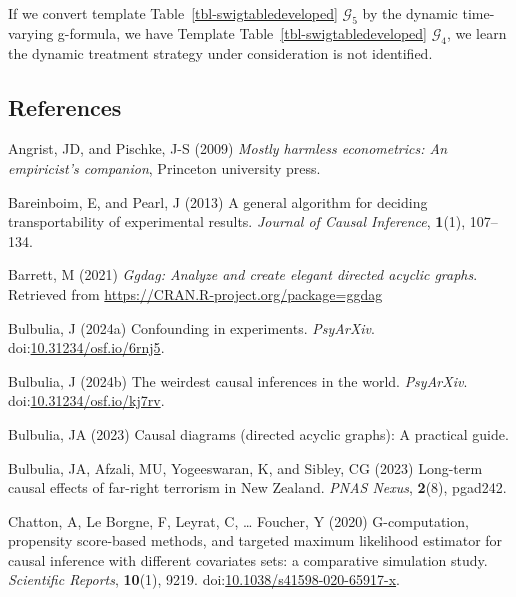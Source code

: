 \documentclass[
  single column]{article}
\newlength{\cslhangindent}
\newenvironment{CSLReferences}[2] %
 {\begin{list}{}{%
  \setlength{\itemindent}{0pt}
  \setlength{\leftmargin}{0pt}
  \setlength{\parsep}{0pt}
  \ifodd #1
   \setlength{\leftmargin}{\cslhangindent}
   \setlength{\itemindent}{-1\cslhangindent}
  \fi
  \setlength{\itemsep}{#2\baselineskip}}}
 {\end{list}}
\begin{document}
If we convert template Table~\ref{tbl-swigtabledeveloped}
\(\mathcal{G}_5\) by the dynamic time-varying g-formula, we have
Template Table~\ref{tbl-swigtabledeveloped} \(\mathcal{G}_4\), we learn
the dynamic treatment strategy under consideration is not identified.

\newpage{}

\subsection{References}\label{references}

\label{refs}
\begin{CSLReferences}{1}{0}
Angrist, JD, and Pischke, J-S (2009) \emph{Mostly harmless econometrics:
An empiricist's companion}, Princeton university press.

Bareinboim, E, and Pearl, J (2013) A general algorithm for deciding
transportability of experimental results. \emph{Journal of Causal
Inference}, \textbf{1}(1), 107--134.

Barrett, M (2021) \emph{Ggdag: Analyze and create elegant directed
acyclic graphs}. Retrieved from
\url{https://CRAN.R-project.org/package=ggdag}

Bulbulia, J (2024a) Confounding in experiments. \emph{PsyArXiv}.
doi:\href{https://doi.org/10.31234/osf.io/6rnj5}{10.31234/osf.io/6rnj5}.

Bulbulia, J (2024b) The weirdest causal inferences in the world.
\emph{PsyArXiv}.
doi:\href{https://doi.org/10.31234/osf.io/kj7rv}{10.31234/osf.io/kj7rv}.

Bulbulia, JA (2023) Causal diagrams (directed acyclic graphs): A
practical guide.

Bulbulia, JA, Afzali, MU, Yogeeswaran, K, and Sibley, CG (2023)
Long-term causal effects of far-right terrorism in {N}ew {Z}ealand.
\emph{PNAS Nexus}, \textbf{2}(8), pgad242.

Chatton, A, Le Borgne, F, Leyrat, C, \ldots{} Foucher, Y (2020)
G-computation, propensity score-based methods, and targeted maximum
likelihood estimator for causal inference with different covariates
sets: a comparative simulation study. \emph{Scientific Reports},
\textbf{10}(1), 9219.
doi:\href{https://doi.org/10.1038/s41598-020-65917-x}{10.1038/s41598-020-65917-x}.


\end{CSLReferences}
\end{document}
